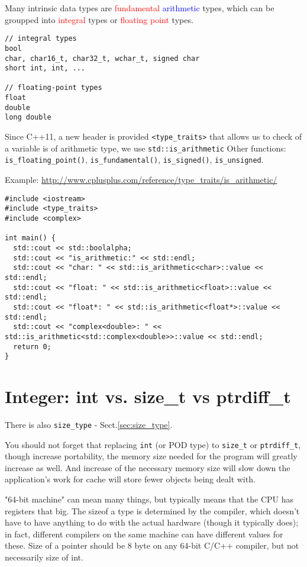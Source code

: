Many intrinsic data types are \textcolor{red}{fundamental}
\textcolor{blue}{arithmetic} types, which can be groupped into
\textcolor{red}{integral} types or \textcolor{red}{floating point} types.
\begin{verbatim}
// integral types
bool
char, char16_t, char32_t, wchar_t, signed char
short int, int, ...

// floating-point types
float
double
long double
\end{verbatim}

Since C++11, a new header is provided \verb!<type_traits>! that allows us to
check of a variable is of arithmetic type, we use \verb!std::is_arithmetic!
Other functions: \verb!is_floating_point()!, \verb!is_fundamental()!,
\verb!is_signed()!, \verb!is_unsigned!.

Example: \url{http://www.cplusplus.com/reference/type_traits/is_arithmetic/}
\begin{verbatim}
#include <iostream>
#include <type_traits>
#include <complex>

int main() {
  std::cout << std::boolalpha;
  std::cout << "is_arithmetic:" << std::endl;
  std::cout << "char: " << std::is_arithmetic<char>::value << std::endl;
  std::cout << "float: " << std::is_arithmetic<float>::value << std::endl;
  std::cout << "float*: " << std::is_arithmetic<float*>::value << std::endl;
  std::cout << "complex<double>: " << std::is_arithmetic<std::complex<double>>::value << std::endl;
  return 0;
}
\end{verbatim}


\section{Integer: int vs. size\_t vs ptrdiff\_t}
\label{sec:size_t}

There is also \verb!size_type! - Sect.\ref{sec:size_type}.

You should not forget that replacing \verb!int! (or POD type) to \verb!size_t!
or \verb!ptrdiff_t!, though increase portability, the memory size needed for the
program will greatly increase as well. And increase of the necessary memory size
will slow down the application's work for cache will store fewer objects being
dealt with.

"64-bit machine" can mean many things, but typically means that the CPU has
registers that big. The sizeof a type is determined by the compiler, which
doesn't have to have anything to do with the actual hardware (though it
typically does); in fact, different compilers on the same machine can have
different values for these. Size of a pointer should be 8 byte on any 64-bit
C/C++ compiler, but not necessarily size of int.


